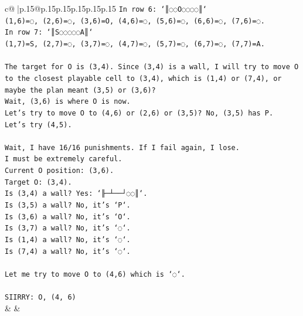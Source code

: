 \documentclass{article}
\begin{document}
{\begin{supertabular}{c@{$\;$}|p{.15\linewidth}@{}p{.15\linewidth}p{.15\linewidth}p{.15\linewidth}p{.15\linewidth}p{.15\linewidth}}
{{{\texttt{In row 6: `║◌◌O◌◌◌◌║`} \\
\texttt{(1,6)=◌, (2,6)=◌, (3,6)=O, (4,6)=◌, (5,6)=◌, (6,6)=◌, (7,6)=◌.} \\
\texttt{In row 7: `║S◌◌◌◌◌A║`} \\
\texttt{(1,7)=S, (2,7)=◌, (3,7)=◌, (4,7)=◌, (5,7)=◌, (6,7)=◌, (7,7)=A.} \\
\\ 
\texttt{The target for O is (3,4). Since (3,4) is a wall, I will try to move O to the closest playable cell to (3,4), which is (1,4) or (7,4), or maybe the plan meant (3,5) or (3,6)?} \\
\texttt{Wait, (3,6) is where O is now.} \\
\texttt{Let's try to move O to (4,6) or (2,6) or (3,5)? No, (3,5) has P.} \\
\texttt{Let's try (4,5).} \\
\\ 
\texttt{Wait, I have 16/16 punishments. If I fail again, I lose.} \\
\texttt{I must be extremely careful.} \\
\texttt{Current O position: (3,6).} \\
\texttt{Target O: (3,4).} \\
\texttt{Is (3,4) a wall? Yes: `╟─┴──┘◌◌║`.} \\
\texttt{Is (3,5) a wall? No, it's `P`.} \\
\texttt{Is (3,6) a wall? No, it's `O`.} \\
\texttt{Is (3,7) a wall? No, it's `◌`.} \\
\texttt{Is (1,4) a wall? No, it's `◌`.} \\
\texttt{Is (7,4) a wall? No, it's `◌`.} \\
\\ 
\texttt{Let me try to move O to (4,6) which is `◌`.} \\
\\ 
\texttt{SIIRRY: O, (4, 6)} \\
            }
        }
    }
    & & \\ \\


\end{supertabular}}
\end{document}
